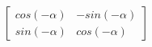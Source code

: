 \documentclass[preview]{standalone}
\begin{document}
\begin{align*}
\begin{bmatrix} cos(-\alpha) & -sin(-\alpha) \\ sin(-\alpha) & cos(-\alpha)\end{bmatrix}
\end{align*}
\end{document}
